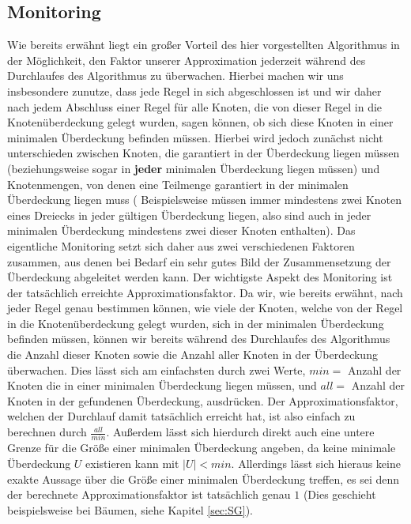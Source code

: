 \documentclass[12pt,onecolumn, notitlepage]{scrartcl}
\begin{document}
\subsection{Monitoring}\label{subsec:Mo}
Wie bereits erwähnt liegt ein großer Vorteil des hier vorgestellten Algorithmus in der Möglichkeit, den Faktor unserer Approximation jederzeit während des Durchlaufes des Algorithmus zu überwachen. Hierbei machen wir uns insbesondere zunutze, dass jede Regel in sich abgeschlossen ist und wir daher nach jedem Abschluss einer Regel für alle Knoten, die von dieser Regel in die Knotenüberdeckung gelegt wurden, sagen können, ob sich diese Knoten in einer minimalen Überdeckung befinden müssen. Hierbei wird jedoch zunächst nicht unterschieden zwischen Knoten, die garantiert in der Überdeckung liegen müssen (beziehungsweise sogar in \textbf{jeder} minimalen Überdeckung liegen müssen) und Knotenmengen, von denen eine Teilmenge garantiert in der minimalen Überdeckung liegen muss ( Beispielsweise müssen immer mindestens zwei Knoten eines Dreiecks in jeder gültigen Überdeckung liegen, also sind auch in jeder minimalen Überdeckung mindestens zwei dieser Knoten enthalten). \newline
Das eigentliche Monitoring setzt sich daher aus zwei verschiedenen Faktoren zusammen, aus denen bei Bedarf ein sehr gutes Bild der Zusammensetzung der Überdeckung abgeleitet werden kann. \newline
Der wichtigste Aspekt des Monitoring ist der tatsächlich erreichte Approximationsfaktor. Da wir, wie bereits erwähnt, nach jeder Regel genau bestimmen können, wie viele der Knoten, welche von der Regel in die Knotenüberdeckung gelegt wurden, sich in der minimalen Überdeckung befinden müssen, können wir bereits während des Durchlaufes des Algorithmus die Anzahl dieser Knoten sowie die Anzahl aller Knoten in der Überdeckung überwachen. Dies lässt sich am einfachsten durch zwei Werte, $min =$ Anzahl der Knoten die in einer minimalen Überdeckung liegen müssen, und $all =$ Anzahl der Knoten in der gefundenen Überdeckung, ausdrücken. Der Approximationsfaktor, welchen der Durchlauf damit tatsächlich erreicht hat, ist also einfach zu berechnen durch $\frac{all}{min}$. Außerdem lässt sich hierdurch direkt auch eine untere Grenze für die Größe einer minimalen Überdeckung angeben, da keine minimale Überdeckung $U$ existieren kann mit $ |U| < min $. Allerdings lässt sich hieraus keine exakte Aussage über die Größe einer minimalen Überdeckung treffen, es sei denn der berechnete Approximationsfaktor ist tatsächlich genau $1$ (Dies geschieht beispielsweise bei Bäumen, siehe Kapitel \ref{sec:SG}). \newline
\end{document}
